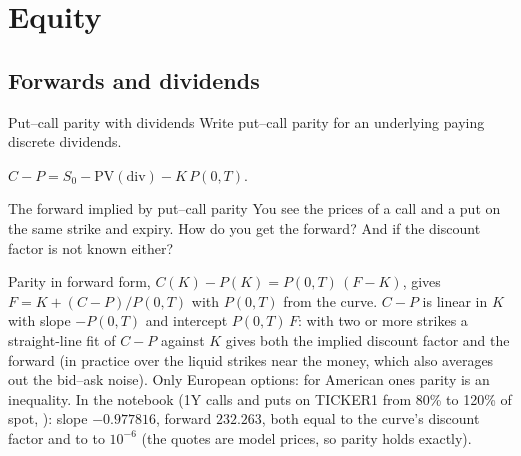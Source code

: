 \section{Equity}\label{sec:equity}

\subsection{Forwards and dividends}

\begin{question}{\Theory {}}{Put--call parity with dividends}
Write put--call parity for an underlying paying discrete dividends.
\end{question}
\begin{answer}
$C - P = S_0 - \mathrm{PV}(\text{div}) - K\,P(0,T)$.
\end{answer}

\begin{question}{\Theory \Practice {}}{The forward implied by put--call parity}
You see the prices of a call and a put on the same strike and expiry. How do you get the forward? And if the discount
factor is not known either?
\end{question}
\begin{answer}
Parity in forward form, $C(K) - P(K) = P(0,T)\,(F - K)$, gives $F = K + (C - P)/P(0,T)$ with $P(0,T)$ from the curve.
$C - P$ is linear in $K$ with slope $-P(0,T)$ and intercept $P(0,T)\,F$: with two or more strikes a straight-line fit
of $C - P$ against $K$ gives both the implied discount factor and the forward (in practice over the liquid strikes near
the money, which also averages out the bid--ask noise). Only European options: for American ones parity is an
inequality. In the notebook (1Y calls and puts on TICKER1 from 80\% to 120\% of spot, ): slope
$-0.977816$, forward $232.263$, both equal to the curve's discount factor and to  to $10^{-6}$
(the quotes are model prices, so parity holds exactly).
\end{answer}

